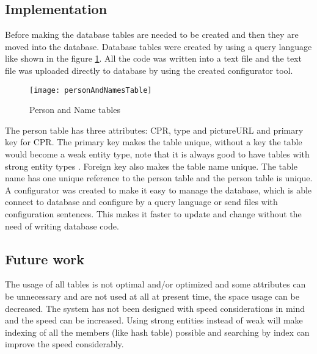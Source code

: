 \subsection{Implementation}

Before making the database tables are needed to be created and then they are moved into the database. Database tables were created by using a query language like shown in the figure \ref{fig:personAndNamesTable}. All the code was written into a text file and the text file was uploaded directly to database by using the created configurator tool.

\begin{figure}[h]
	\centering
		\texttt{[image: personAndNamesTable]}
	\caption{Person and Name tables}
	\label{fig:personAndNamesTable}
\end{figure}

The person table has three attributes: CPR, type and pictureURL and primary key for CPR. The primary key makes the table unique, without a key the table would become a weak entity type, note that it is always good to have tables with strong entity types \cite{bib4}. Foreign key also makes the table name unique. The table name has one unique reference to the person table and the person table is unique. \\ A configurator was created to make it easy to manage the database, which is able connect to database and configure by a query language or send files with configuration sentences. This makes it faster to update and change without the need of writing database code. 

\subsection{Future work}

The usage of all tables is not optimal and/or optimized and some attributes can be unnecessary and are not used at all at present time, the space usage can be decreased. The system has not been designed with speed considerations in mind and the speed can be increased. Using strong entities instead of weak will make indexing of all the members (like hash table) possible and searching by index can improve the speed considerably.